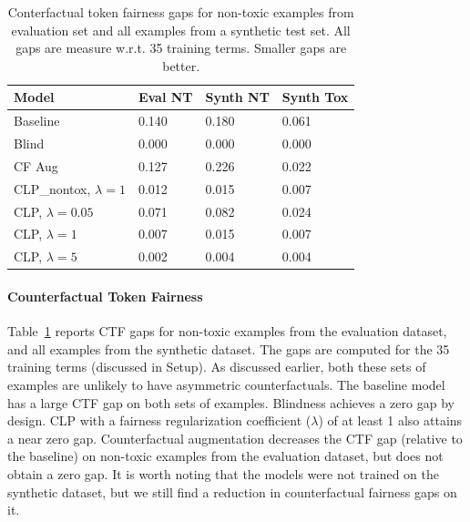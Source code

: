 \documentclass[letterpaper]{article} %
\theoremstyle{definition}
\begin{document}
\begin{table}[]
\begin{tabular}{|l|l|l|l|}
\hline
Model                      & Eval NT & Synth NT & Synth Tox \\ \hline
Baseline                   & 0.140             & 0.180              & 0.061           \\ \hline
Blind                      & 0.000             & 0.000              & 0.000           \\ \hline
CF Aug            & 0.127             & 0.226              & 0.022           \\ \hline
CLP\_nontox, $\lambda=1$ & 0.012             & 0.015              & 0.007           \\ \hline
CLP,  $\lambda=0.05$       & 0.071             & 0.082              & 0.024           \\ \hline
CLP,  $\lambda=1$          & 0.007             & 0.015              & 0.007           \\ \hline
CLP,  $\lambda=5$          & 0.002             & 0.004              & 0.004           \\ \hline
\end{tabular}
\caption{Conterfactual token fairness gaps for non-toxic examples from evaluation set and all examples from a synthetic test set.
All gaps are measure w.r.t. 35 training terms. Smaller gaps are better. 
}
\label{tab:ctf}

\end{table}

\paragraph{Counterfactual Token Fairness}
Table~\ref{tab:ctf} reports CTF gaps for non-toxic examples from the evaluation dataset, and all examples from the synthetic dataset. The gaps are computed for the 35 training terms (discussed in Setup). As discussed earlier, both these sets of examples are unlikely to have asymmetric counterfactuals. The baseline model has a large CTF gap on both sets of examples.
Blindness achieves a zero gap by design. CLP with a fairness regularization coefficient ($\lambda$) of at least 1 also attains a near zero gap. Counterfactual augmentation decreases the CTF gap (relative to the baseline) on non-toxic examples from the evaluation dataset, but does not obtain a zero gap.
It is worth noting that the models were not trained on the synthetic dataset, but we still find a reduction in counterfactual fairness gaps on it. 
\end{document}
